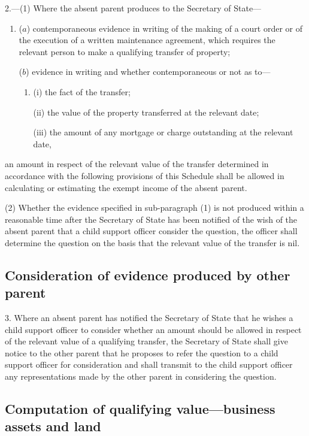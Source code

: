 \documentclass[12pt,a4paper]{article}
\begin{document}
2.—(1) Where the absent parent produces to the Secretary of State—
\begin{enumerate}\item[]
($a$) contemporaneous evidence in writing of the making of a court order or of the execution of a written maintenance agreement, which requires the relevant person to make a qualifying transfer of property;

($b$) evidence in writing and whether contemporaneous or not as to—
\begin{enumerate}\item[]
(i) the fact of the transfer;

(ii) the value of the property transferred at the relevant date;

(iii) the amount of any mortgage or charge outstanding at the relevant date,
\end{enumerate}
\end{enumerate}
an amount in respect of the relevant value of the transfer determined in accordance with the following provisions of this Schedule shall be allowed in calculating or estimating the exempt income of the absent parent.

(2) Whether the evidence specified in sub-paragraph (1) is not produced within a reasonable time after the Secretary of State has been notified of the wish of the absent parent that a child support officer consider the question, the officer shall determine the question on the basis that the relevant value of the transfer is nil.

\subsection*{Consideration of evidence produced by other parent}

3.  Where an absent parent has notified the Secretary of State that he wishes a child support officer to consider whether an amount should be allowed in respect of the relevant value of a qualifying transfer, the Secretary of State shall give notice to the other parent that he proposes to refer the question to a child support officer for consideration and shall transmit to the child support officer any representations made by the other parent in considering the question.

\subsection*{{Computation of qualifying value—business assets} and land}
\end{document}

